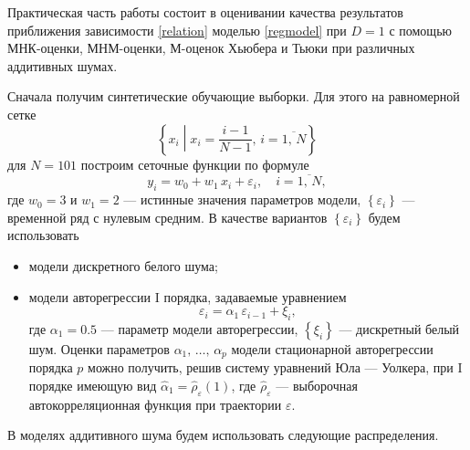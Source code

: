\documentclass[12pt,a4paper]{article}
\begin{document}
	Практическая часть работы состоит в оценивании качества результатов приближения зависимости \eqref{relation} моделью \eqref{regmodel} при $D = 1$ с помощью МНК-оценки, МНМ-оценки, М-оценок Хьюбера и Тьюки при различных аддитивных шумах.
	
	Сначала получим синтетические обучающие выборки. Для этого на равномерной сетке
	\begin{equation*}
		\left\{ x_i \middle| x_i = \frac{i-1}{N-1}, \, i = \overline{1,\,N} \right\}
	\end{equation*}
	для $N = 101$ построим сеточные функции по формуле
	\begin{equation*}
		y_i = w_0 + w_1 \, x_i + \varepsilon_i, \quad i = \overline{1,\,N},
	\end{equation*}
	где $w_0 = 3$ и $w_1 = 2$ --- истинные значения параметров модели, $\left\{ \varepsilon_i \right\}$ --- временной ряд с нулевым средним. В качестве вариантов $\left\{ \varepsilon_i \right\}$ будем использовать
	\begin{itemize}
		\item модели дискретного белого шума;
		\item модели авторегрессии I порядка, задаваемые уравнением
		\begin{equation*}
			\varepsilon_i = \alpha_1 \, \varepsilon_{i-1} + \xi_i,
		\end{equation*}
		где $\alpha_1 = 0.5$ --- параметр модели авторегрессии, $\left\{ \xi_i \right\}$ --- дискретный белый шум. Оценки параметров $\alpha_1,\,\ldots,\,\alpha_p$ модели стационарной авторегрессии порядка $p$ можно получить, решив систему уравнений Юла --- Уолкера, при I порядке имеющую вид $\widehat\alpha_1 = \widehat\rho_{\varepsilon}(1)$, где $\widehat\rho_{\varepsilon}$ --- выборочная автокорреляционная функция при траектории $\varepsilon$.
	\end{itemize}
	В моделях аддитивного шума будем использовать следующие распределения.
\end{document}
